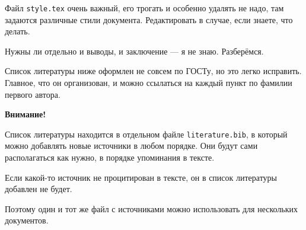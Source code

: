 \documentclass[14pt,oneside]{extarticle}
\begin{document}
Файл \verb|style.tex| очень важный, его трогать и особенно удалять не надо, там задаются различные стили документа. Редактировать в случае, если знаете, что делать.


Нужны ли отдельно и выводы, и заключение --- я не знаю. Разберёмся.

Список литературы ниже оформлен не совсем по ГОСТу, но это легко исправить. Главное, что он организован, и можно ссылаться на каждый пункт по фамилии первого автора.

\textbf{Внимание!} 

Список литературы находится в отдельном файле \verb|literature.bib|, в который можно добавлять новые источники в любом порядке. Они будут сами располагаться как нужно, в порядке упоминания в тексте.

Если какой-то источник не процитирован в тексте, он в список литературы добавлен не будет.

Поэтому один и тот же файл с источниками можно использовать для нескольких документов.


\pagebreak
\printbibliography
\end{document}
